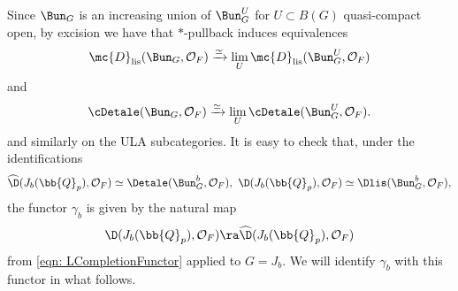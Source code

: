 \documentclass[letterpaper,11pt]{amsart}
\begin{document}
Since $\Bun_{G}$ is an increasing union of $\Bun_{G}^{U}$ for $U \subset B(G)$ quasi-compact open, by excision we have that $*$-pullback induces equivalences
\begin{equation}{\label{eqn: lissesubstackequivalence}}
\mc{D}_{\mathrm{lis}}(\Bun_{G},\mathcal{O}_{F}) \xrightarrow{\simeq} \lim_{U} \mc{D}_{\mathrm{lis}}(\Bun_{G}^{U},\mathcal{O}_{F}) 
\end{equation}
and 
\begin{equation}{\label{eqn: etalesubstackequivalence}}
 \cDetale(\Bun_{G},\mathcal{O}_{F}) \xrightarrow{\simeq} \lim_{U} \cDetale(\Bun_{G}^{U},\mathcal{O}_{F}). 
\end{equation}
and similarly on the ULA subcategories. It is easy to check that, under the identifications 
\[\widehat{\D}(J_{b}(\bb{Q}_{p}),\mathcal{O}_{F}) \simeq \Detale(\Bun_{G}^{b},\mathcal{O}_{F}),\,\,\D(J_{b}(\bb{Q}_{p}),\mathcal{O}_{F}) \simeq \Dlis(\Bun_{G}^{b},\mathcal{O}_{F}),\] the functor  $\gamma_{b}$ is given by the natural map
\begin{equation}{\label{eqn: lcompletioninJb}}
 \D(J_{b}(\bb{Q}_{p}),\mathcal{O}_{F}) \ra \widehat{\D}(J_{b}(\bb{Q}_{p}),\mathcal{O}_{F}) 
\end{equation}
from \eqref{eqn: LCompletionFunctor} applied to $G = J_{b}$. We will identify $\gamma_{b}$ with this functor in what follows.
\end{document}
